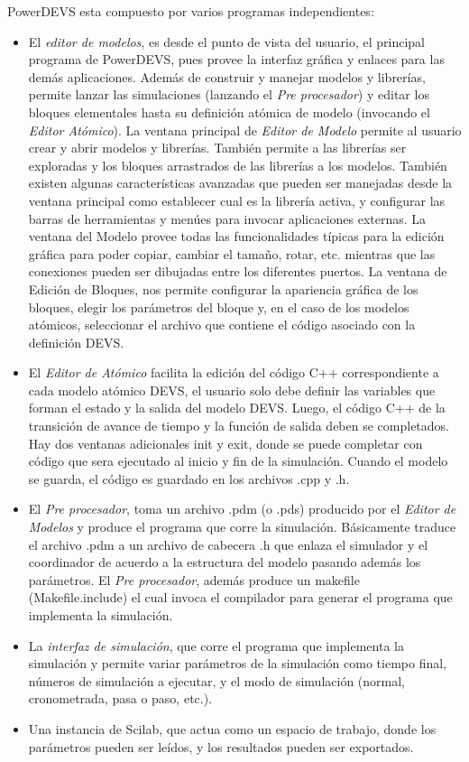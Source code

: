 \documentclass[a4paper,	11pt]{report}
\begin{document}
PowerDEVS esta compuesto por varios programas independientes:
\begin{itemize}
\item El \emph{editor de modelos}, es desde el punto de vista del usuario, el principal programa de PowerDEVS, pues provee la interfaz gráfica y enlaces para las demás aplicaciones. 
Además de construir y manejar modelos y librerías, permite lanzar las simulaciones (lanzando el \emph{Pre procesador}) y editar los bloques elementales hasta su definición atómica de modelo (invocando el \emph{Editor Atómico}).
La ventana principal de \emph{Editor de Modelo} permite al usuario crear y abrir modelos y librerías. También permite a las librerías ser exploradas y los bloques arrastrados de las librerías a los modelos.
También existen algunas características avanzadas que pueden ser manejadas desde la ventana principal como establecer cual es la librería activa, y configurar las barras de herramientas y menúes para invocar aplicaciones externas.
La ventana del Modelo provee todas las funcionalidades típicas para la edición gráfica para poder copiar, cambiar el tamaño, rotar, etc. mientras que las conexiones pueden ser dibujadas entre los diferentes puertos.
La ventana de Edición de Bloques, nos permite configurar la apariencia gráfica de los bloques, elegir los parámetros del bloque y, en el caso de los modelos atómicos, seleccionar el archivo que contiene el código asociado con la definición DEVS.

\item El \emph{Editor de Atómico} facilita la edición del código C++ correspondiente a cada modelo atómico DEVS, el usuario solo debe definir las variables que forman el estado y la salida del modelo DEVS. Luego, el código C++ de la transición de avance de tiempo y la función de salida deben se completados. Hay dos ventanas adicionales init y exit, donde se puede completar con código que sera ejecutado al inicio y fin de la simulación.
Cuando el modelo se guarda, el código es guardado en los archivos .cpp y .h. 

\item El \emph{Pre procesador}, toma un archivo .pdm (o .pds) producido por el \emph{Editor de Modelos} y produce el programa que corre la simulación. Básicamente traduce el archivo .pdm a un archivo de cabecera .h que enlaza el simulador y el coordinador de acuerdo a la estructura del modelo pasando además los parámetros.
El \emph{Pre procesador}, además produce un makefile (Makefile.include) el cual invoca el compilador para generar el programa que implementa la simulación. 

\item La \emph{interfaz de simulación}, que corre el programa que implementa la simulación y permite variar parámetros de la simulación como tiempo final, números de simulación a ejecutar, y el modo de simulación (normal, cronometrada, pasa o paso, etc.).

\item Una instancia de Scilab, que actua como un espacio de trabajo, donde los parámetros pueden ser leídos, y los resultados pueden ser exportados. 
\end{itemize}
\end{document}
